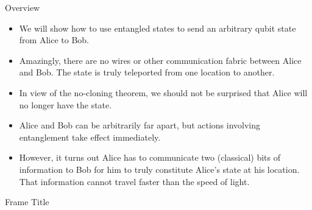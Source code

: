 
\begin{frame}{Overview}
    \begin{itemize}
        \item We will show how to use entangled states to send an arbitrary qubit state from Alice to Bob.
        \item Amazingly, there are no wires or other communication fabric between Alice and Bob.  The state is truly teleported from one location to another.
        \item In view of the no-cloning theorem, we should not be surprised that Alice will no longer have the state.
        \item Alice and Bob can be arbitrarily far apart, but actions involving entanglement take effect immediately.
        \item However, it turns out Alice has to communicate two (classical) bits of information to Bob for him to truly constitute Alice's state at his location.  That information cannot travel faster than the speed of light.
    \end{itemize}
\end{frame}

\begin{frame}{Frame Title}
    
\end{frame}